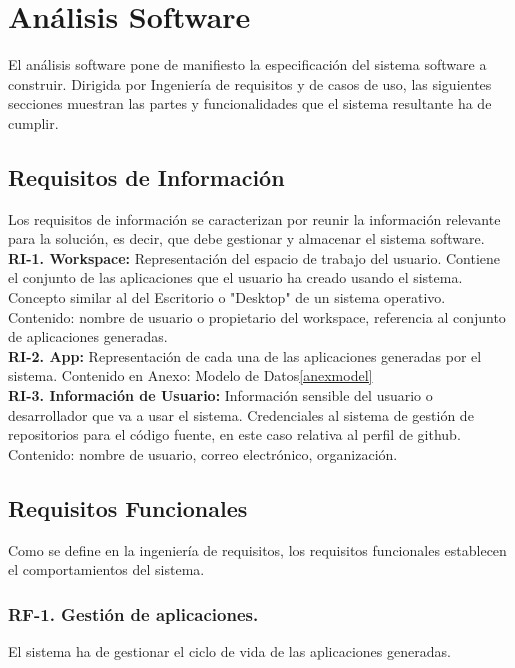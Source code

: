\documentclass[a4paper,11pt]{book}
\begin{document}
\section{Análisis Software}

El análisis software pone de manifiesto la especificación del sistema software a construir. Dirigida por Ingeniería de requisitos y de casos de uso, las siguientes secciones muestran las partes y funcionalidades que el sistema resultante ha de cumplir.

\subsection{Requisitos de Información }
Los requisitos de información se caracterizan por reunir la información relevante para la solución, es decir, que debe gestionar y almacenar el sistema software.\\

\textbf{RI-1. Workspace:} Representación del espacio de trabajo del usuario. Contiene el conjunto de las aplicaciones que el usuario ha creado usando el sistema. Concepto similar al del Escritorio o "Desktop" de un sistema operativo.
Contenido: nombre de usuario o propietario del workspace, referencia al conjunto de aplicaciones generadas. \\
\textbf{RI-2. App:} Representación de cada una de las aplicaciones generadas por el sistema.
Contenido en Anexo: Modelo de Datos\ref{anexmodel}\\
\textbf{RI-3. Información de Usuario:} Información sensible del usuario o desarrollador que va a usar el sistema. Credenciales al sistema de gestión de repositorios para el código fuente, en este caso relativa al perfil de github.
Contenido: nombre de usuario, correo electrónico, organización. \\


\subsection{Requisitos Funcionales }
Como se define en la ingeniería de requisitos, los requisitos funcionales establecen el comportamientos del sistema.\\



\subsubsection { \textbf{ RF-1. Gestión de aplicaciones.}} El sistema ha de gestionar el ciclo de vida de las aplicaciones generadas.\\
\end{document}
